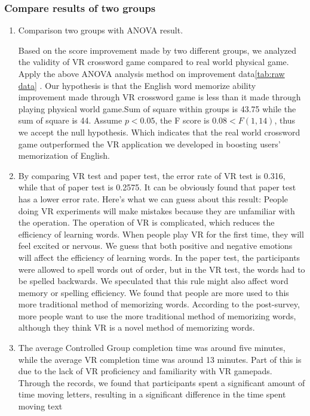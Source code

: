 \documentclass{vgtc}                          %
\begin{document}
\subsubsection{Compare results of two groups}
\begin{enumerate}
  \item Comparison two groups with ANOVA result.
    
    Based on the score improvement made by two different groups, we analyzed the validity of VR crossword game compared to real world physical game. Apply the above ANOVA analysis method on improvement data\ref{tab:raw data} \cite{10.1145/206944.207007}\cite{DRISCOLL1996265}. Our hypothesis is that the English word memorize ability improvement made through VR crossword game is less than it made through playing physical world game.Sum of square within groups is 43.75 while the sum of square is 44. Assume $p<0.05$, the F score is $0.08<F(1,14)$, thus we accept the null hypothesis\cite{driscoll1996robustness}. Which indicates that the real world crossword game outperformed the VR application we developed in boosting users' memorization of English\cite{fata2016down}.
    
  \item By comparing VR test and paper test, the error rate of VR test is 0.316, while that of paper test is 0.2575. It can be obviously found that paper test has a lower error rate. Here's what we can guess about this result: People doing VR experiments will make mistakes because they are unfamiliar with the operation. The operation of VR is complicated, which reduces the efficiency of learning words. When people play VR for the first time, they will feel excited or nervous. We guess that both positive and negative emotions will affect the efficiency of learning words. In the paper test, the participants were allowed to spell words out of order, but in the VR test, the words had to be spelled backwards. We speculated that this rule might also affect word memory or spelling efficiency. We found that people are more used to this more traditional method of memorizing words. According to the post-survey, more people want to use the more traditional method of memorizing words, although they think VR is a novel method of memorizing words.
  \item The average Controlled Group completion time was around five minutes, while the average VR completion time was around 13 minutes. Part of this is due to the lack of VR proficiency and familiarity with VR gamepads. Through the records, we found that participants spent a significant amount of time moving letters, resulting in a significant difference in the time spent moving text
    

\end{enumerate}
\end{document}
